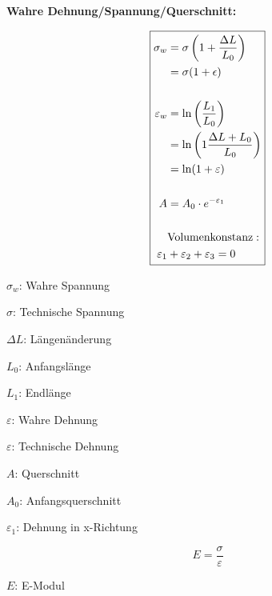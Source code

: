\textbf{Wahre Dehnung/Spannung/Querschnitt:}\\
\begin{minipage}{0.5\linewidth}
    \[
    \boxed{
        \begin{aligned}
            \sigma_{w} &= \sigma \left(1 + \frac{\Delta L}{L_0} \right)\\ 
            &= \sigma (1 + \epsilon)\\
            \vspace{1mm}\\
            \varepsilon_w &= \ln \left(\frac{L_1}{L_0} \right)\\
            &= \ln \left(1\frac{\Delta L + L_0}{L_0} \right)\\
            &= \ln (1 +\varepsilon)\\
            \vspace{1mm}\\
            A &= A_0 \cdot e^{-\varepsilon_1}\\
            \vspace{1mm}\\
            &\text{Volumenkonstanz}:\\
            \varepsilon_1 &+ \varepsilon_2 + \varepsilon_3 = 0
        \end{aligned}
    }
    \]
\end{minipage}
\begin{minipage}{0.5\linewidth}
    \item $\sigma_{w}$: Wahre Spannung
    \item $\sigma$: Technische Spannung
    \item $\Delta L$: Längenänderung
    \item $L_0$: Anfangslänge
    \item $L_1$: Endlänge
    \item $\varepsilon$: Wahre Dehnung
    \item $\varepsilon$: Technische Dehnung
    \item $A$: Querschnitt
    \item $A_0$: Anfangsquerschnitt
    \item $\varepsilon_1$: Dehnung in x-Richtung
\end{minipage}
\vspace{1mm}

\begin{minipage}{0.5\linewidth}
    \[
    \boxed{        
            E = \frac{\sigma}{\varepsilon}
    }
    \]
\end{minipage}
\begin{minipage}{0.5\linewidth}
    \item $E$: E-Modul
\end{minipage}
\vspace{1mm}

